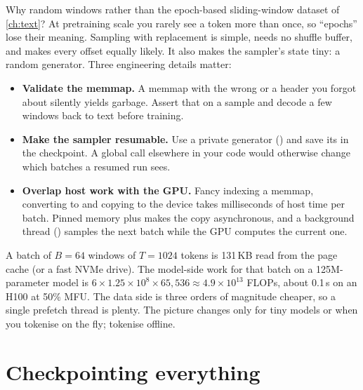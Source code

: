 Why random windows rather than the epoch-based sliding-window dataset of \cref{ch:text}? At
pretraining scale you rarely see a token more than once, so ``epochs'' lose their meaning. Sampling with
replacement is simple, needs no shuffle buffer, and makes every offset equally likely. It also
makes the sampler's state tiny: a random generator. Three engineering details matter:

\begin{itemize}
  \item \textbf{Validate the memmap.} A memmap with the wrong  or a header you forgot
        about silently yields garbage. Assert that  on a sample and decode
        a few windows back to text before training.
  \item \textbf{Make the sampler resumable.} Use a private generator
        () and save its  in the
        checkpoint. A global  call elsewhere in your code would otherwise change
        which batches a resumed run sees.
  \item \textbf{Overlap host work with the GPU.} Fancy indexing a memmap, converting to
         and copying to the device takes milliseconds of host time per batch. Pinned
        memory plus  makes the copy asynchronous, and a background thread
        () samples the next batch while the GPU computes the current one.
\end{itemize}

\begin{napkinmath}
A batch of $B=64$ windows of $T=1024$  tokens is 131\,KB read from the page cache
(or a fast NVMe drive). The model-side work for that batch on a 125M-parameter model is
$6\times1.25\times10^8\times65{,}536 \approx 4.9\times10^{13}$ FLOPs, about 0.1\,s on an H100 at
50\% MFU. The data side is three orders of magnitude cheaper, so a single prefetch thread is
plenty. The picture changes only for tiny models or when you tokenise on the fly; tokenise
offline.
\end{napkinmath}

\section{Checkpointing everything}\label{sec:optim:ckpt}

